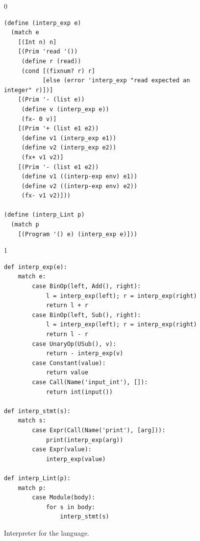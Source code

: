 \documentclass[7x10]{TimesAPriori_MIT}%
\def\racketEd{0}
\def\pythonEd{1}
\def\edition{0}
\numberwithin{theorem}{chapter}
\numberwithin{definition}{chapter}
\numberwithin{equation}{chapter}
\begin{document}
\begin{figure}[tp]
\begin{tcolorbox}[colback=white]
{\if\edition\racketEd
\begin{lstlisting}
(define (interp_exp e)
  (match e
    [(Int n) n]
    [(Prim 'read '())
     (define r (read))
     (cond [(fixnum? r) r]
           [else (error 'interp_exp "read expected an integer" r)])]
    [(Prim '- (list e))
     (define v (interp_exp e))
     (fx- 0 v)]
    [(Prim '+ (list e1 e2))
     (define v1 (interp_exp e1))
     (define v2 (interp_exp e2))
     (fx+ v1 v2)]
    [(Prim '- (list e1 e2))
     (define v1 ((interp-exp env) e1))
     (define v2 ((interp-exp env) e2))
     (fx- v1 v2)]))

(define (interp_Lint p)
  (match p
    [(Program '() e) (interp_exp e)]))
\end{lstlisting}
\fi}
{\if\edition\pythonEd
\begin{lstlisting}
def interp_exp(e):
    match e:
        case BinOp(left, Add(), right):
            l = interp_exp(left); r = interp_exp(right)
            return l + r
        case BinOp(left, Sub(), right):
            l = interp_exp(left); r = interp_exp(right)
            return l - r
        case UnaryOp(USub(), v):
            return - interp_exp(v)
        case Constant(value):
            return value
        case Call(Name('input_int'), []):
            return int(input())            

def interp_stmt(s):
    match s:
        case Expr(Call(Name('print'), [arg])):
            print(interp_exp(arg))
        case Expr(value):
            interp_exp(value)

def interp_Lint(p):
    match p:
        case Module(body):
            for s in body:
                interp_stmt(s)
\end{lstlisting}
\fi}
\end{tcolorbox}

\caption{Interpreter for the \LangInt{} language.}
\label{fig:interp_Lint}
\end{figure}
\end{document}
